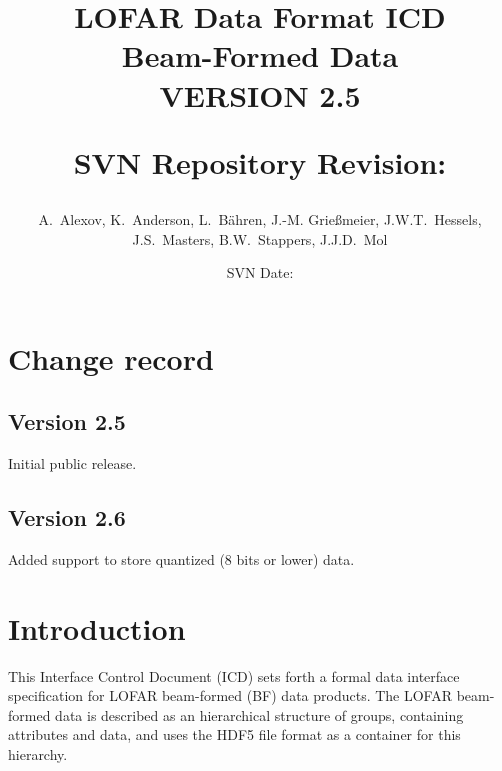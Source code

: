 \documentclass[a4paper,10pt,bibtotoc]{scrartcl}
\begin{document}
\title{LOFAR Data Format ICD \\ Beam-Formed Data \\
{\normalsize VERSION 2.5} \\
\author{A.~Alexov, K.~Anderson, L.~B\"ahren, J.-M. Grie{\ss}meier, J.W.T.~Hessels, \\
J.S.~Masters, B.W.~Stappers, J.J.D.~Mol}
{\normalsize SVN Repository Revision: \svnInfoMaxRevision}}
\date{\small{SVN Date: \svnInfoMaxToday}}
\maketitle

\tableofcontents

\clearpage


\section*{Change record}

\subsection*{Version 2.5}

Initial public release.

\subsection*{Version 2.6}

Added support to store quantized (8 bits or lower) data.



\clearpage


\section{Introduction}  
\label{sec:introduction}

This Interface Control Document (ICD) sets forth a formal data interface specification for
LOFAR beam-formed (BF) data products. The LOFAR beam-formed data is described as an hierarchical
structure of groups, containing attributes and data, and uses the HDF5 file format as a
container for this hierarchy.
\end{document}
